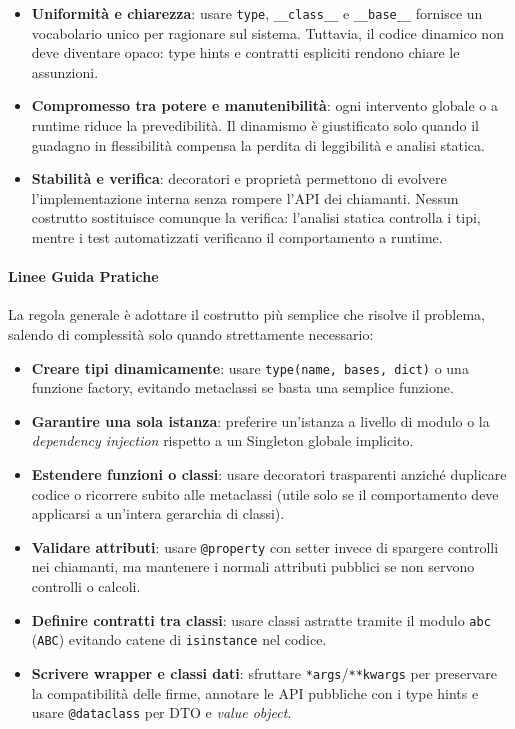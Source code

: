 \documentclass[12pt]{extarticle}
\begin{document}
\begin{itemize}
    \item \textbf{Uniformità e chiarezza}: usare \texttt{type}, \texttt{\_\_class\_\_} e \texttt{\_\_base\_\_} fornisce un vocabolario unico per ragionare sul sistema. Tuttavia, il codice dinamico non deve diventare opaco: type hints e contratti espliciti rendono chiare le assunzioni.
    \item \textbf{Compromesso tra potere e manutenibilità}: ogni intervento globale o a runtime riduce la prevedibilità. Il dinamismo è giustificato solo quando il guadagno in flessibilità compensa la perdita di leggibilità e analisi statica.
    \item \textbf{Stabilità e verifica}: decoratori e proprietà permettono di evolvere l'implementazione interna senza rompere l'API dei chiamanti. Nessun costrutto sostituisce comunque la verifica: l'analisi statica controlla i tipi, mentre i test automatizzati verificano il comportamento a runtime.
\end{itemize}

\paragraph{Linee Guida Pratiche}

La regola generale è adottare il costrutto più semplice che risolve il problema, salendo di complessità solo quando strettamente necessario:

\begin{itemize}
    \item \textbf{Creare tipi dinamicamente}: usare \texttt{type(name, bases, dict)} o una funzione factory, evitando metaclassi se basta una semplice funzione.
    \item \textbf{Garantire una sola istanza}: preferire un'istanza a livello di modulo o la \emph{dependency injection} rispetto a un Singleton globale implicito.
    \item \textbf{Estendere funzioni o classi}: usare decoratori trasparenti anziché duplicare codice o ricorrere subito alle metaclassi (utile solo se il comportamento deve applicarsi a un'intera gerarchia di classi).
    \item \textbf{Validare attributi}: usare \texttt{@property} con setter invece di spargere controlli nei chiamanti, ma mantenere i normali attributi pubblici se non servono controlli o calcoli.
    \item \textbf{Definire contratti tra classi}: usare classi astratte tramite il modulo \texttt{abc} (\texttt{ABC}) evitando catene di \texttt{isinstance} nel codice.
    \item \textbf{Scrivere wrapper e classi dati}: sfruttare \texttt{*args}/\texttt{**kwargs} per preservare la compatibilità delle firme, annotare le API pubbliche con i type hints e usare \texttt{@dataclass} per DTO e \emph{value object}.
\end{itemize}
\end{document}
